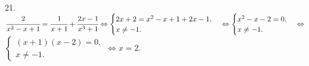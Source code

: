 21. $\cfrac{2}{x^2-x+1}=\cfrac{1}{x+1}+\cfrac{2x-1}{x^3+1}\Leftrightarrow \begin{cases} 2x+2=x^2-x+1+2x-1,\\ x\neq-1.\end{cases}
\Leftrightarrow \begin{cases} x^2-x-2=0,\\ x\neq-1.\end{cases}\Leftrightarrow$\\$\begin{cases} (x+1)(x-2)=0,\\ x\neq-1.\end{cases}\Leftrightarrow x=2.$\\
